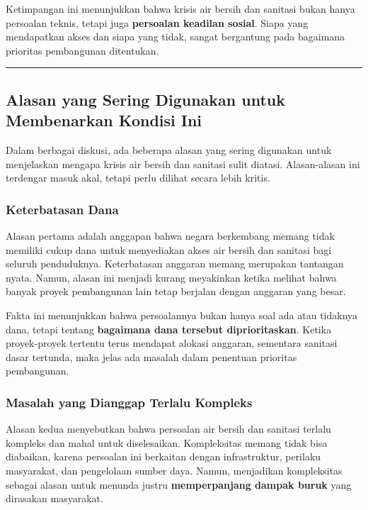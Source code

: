 \documentclass[
  letterpaper,
  DIV=11,
  numbers=noendperiod]{scrreprt}
\begin{document}
Ketimpangan ini menunjukkan bahwa krisis air bersih dan sanitasi bukan
hanya persoalan teknis, tetapi juga \textbf{persoalan keadilan sosial}.
Siapa yang mendapatkan akses dan siapa yang tidak, sangat bergantung
pada bagaimana prioritas pembangunan ditentukan.

\begin{center}\rule{0.5\linewidth}{0.5pt}\end{center}

\subsection{Alasan yang Sering Digunakan untuk Membenarkan Kondisi
Ini}\label{alasan-yang-sering-digunakan-untuk-membenarkan-kondisi-ini}

Dalam berbagai diskusi, ada beberapa alasan yang sering digunakan untuk
menjelaskan mengapa krisis air bersih dan sanitasi sulit diatasi.
Alasan-alasan ini terdengar masuk akal, tetapi perlu dilihat secara
lebih kritis.

\subsubsection{Keterbatasan Dana}\label{keterbatasan-dana}

Alasan pertama adalah anggapan bahwa negara berkembang memang tidak
memiliki cukup dana untuk menyediakan akses air bersih dan sanitasi bagi
seluruh penduduknya. Keterbatasan anggaran memang merupakan tantangan
nyata. Namun, alasan ini menjadi kurang meyakinkan ketika melihat bahwa
banyak proyek pembangunan lain tetap berjalan dengan anggaran yang
besar.

Fakta ini menunjukkan bahwa persoalannya bukan hanya soal ada atau
tidaknya dana, tetapi tentang \textbf{bagaimana dana tersebut
diprioritaskan}. Ketika proyek-proyek tertentu terus mendapat alokasi
anggaran, sementara sanitasi dasar tertunda, maka jelas ada masalah
dalam penentuan prioritas pembangunan.

\subsubsection{Masalah yang Dianggap Terlalu
Kompleks}\label{masalah-yang-dianggap-terlalu-kompleks}

Alasan kedua menyebutkan bahwa persoalan air bersih dan sanitasi terlalu
kompleks dan mahal untuk diselesaikan. Kompleksitas memang tidak bisa
diabaikan, karena persoalan ini berkaitan dengan infrastruktur, perilaku
masyarakat, dan pengelolaan sumber daya. Namun, menjadikan kompleksitas
sebagai alasan untuk menunda justru \textbf{memperpanjang dampak buruk}
yang dirasakan masyarakat.
\end{document}
